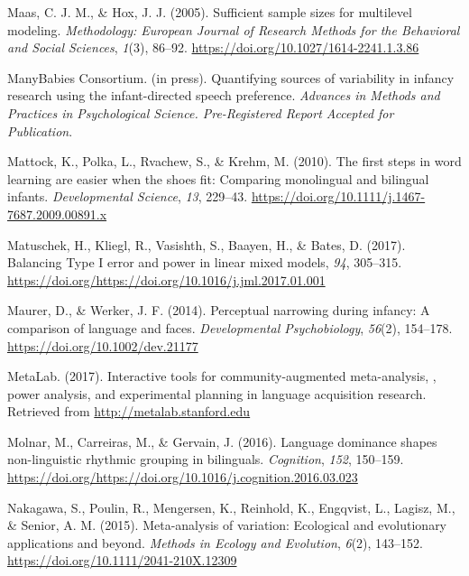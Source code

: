 \documentclass[,man,floatsintext]{apa6}
\begin{document}
\leavevmode\hypertarget{ref-maas_2005}{}%
Maas, C. J. M., \& Hox, J. J. (2005). Sufficient sample sizes for multilevel modeling. \emph{Methodology: European Journal of Research Methods for the Behavioral and Social Sciences}, \emph{1}(3), 86--92. \url{https://doi.org/10.1027/1614-2241.1.3.86}

\leavevmode\hypertarget{ref-manybabies_consortium_2020}{}%
ManyBabies Consortium. (in press). Quantifying sources of variability in infancy research using the infant-directed speech preference. \emph{Advances in Methods and Practices in Psychological Science. Pre-Registered Report Accepted for Publication}.

\leavevmode\hypertarget{ref-mattock_2010}{}%
Mattock, K., Polka, L., Rvachew, S., \& Krehm, M. (2010). The first steps in word learning are easier when the shoes fit: Comparing monolingual and bilingual infants. \emph{Developmental Science}, \emph{13}, 229--43. \url{https://doi.org/10.1111/j.1467-7687.2009.00891.x}

\leavevmode\hypertarget{ref-matuschek_2017}{}%
Matuschek, H., Kliegl, R., Vasishth, S., Baayen, H., \& Bates, D. (2017). Balancing Type I error and power in linear mixed models, \emph{94}, 305--315. \url{https://doi.org/https://doi.org/10.1016/j.jml.2017.01.001}

\leavevmode\hypertarget{ref-maurer_2014}{}%
Maurer, D., \& Werker, J. F. (2014). Perceptual narrowing during infancy: A comparison of language and faces. \emph{Developmental Psychobiology}, \emph{56}(2), 154--178. \url{https://doi.org/10.1002/dev.21177}

\leavevmode\hypertarget{ref-metalab_2017}{}%
MetaLab. (2017). Interactive tools for community-augmented meta-analysis, , power analysis, and experimental planning in language acquisition research. Retrieved from \url{http://metalab.stanford.edu}

\leavevmode\hypertarget{ref-molnar_2016}{}%
Molnar, M., Carreiras, M., \& Gervain, J. (2016). Language dominance shapes non-linguistic rhythmic grouping in bilinguals. \emph{Cognition}, \emph{152}, 150--159. \url{https://doi.org/https://doi.org/10.1016/j.cognition.2016.03.023}

\leavevmode\hypertarget{ref-nakagawa_2015}{}%
Nakagawa, S., Poulin, R., Mengersen, K., Reinhold, K., Engqvist, L., Lagisz, M., \& Senior, A. M. (2015). Meta-analysis of variation: Ecological and evolutionary applications and beyond. \emph{Methods in Ecology and Evolution}, \emph{6}(2), 143--152. \url{https://doi.org/10.1111/2041-210X.12309}
\end{document}
